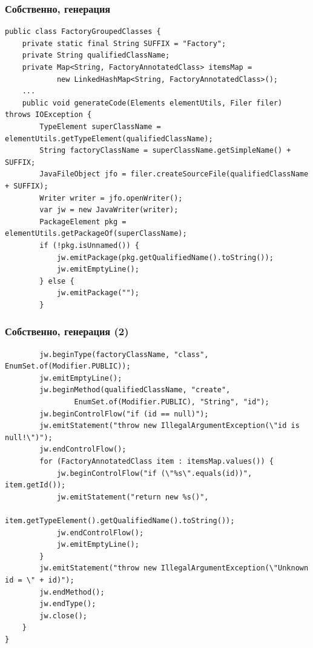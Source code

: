 \documentclass[xetex,mathserif,serif]{beamer}
\begin{document}
	\begin{frame}[fragile]
		\frametitle{Собственно, генерация}
		\begin{footnotesize}
			\begin{verbatim}
public class FactoryGroupedClasses {
    private static final String SUFFIX = "Factory";
    private String qualifiedClassName;
    private Map<String, FactoryAnnotatedClass> itemsMap =
            new LinkedHashMap<String, FactoryAnnotatedClass>();
    ...
    public void generateCode(Elements elementUtils, Filer filer) throws IOException {
        TypeElement superClassName = elementUtils.getTypeElement(qualifiedClassName);
        String factoryClassName = superClassName.getSimpleName() + SUFFIX;
        JavaFileObject jfo = filer.createSourceFile(qualifiedClassName + SUFFIX);
        Writer writer = jfo.openWriter();
        var jw = new JavaWriter(writer);
        PackageElement pkg = elementUtils.getPackageOf(superClassName);
        if (!pkg.isUnnamed()) {
            jw.emitPackage(pkg.getQualifiedName().toString());
            jw.emitEmptyLine();
        } else {
            jw.emitPackage("");
        }
			\end{verbatim}
		\end{footnotesize}
	\end{frame}

	\begin{frame}[fragile]
		\frametitle{Собственно, генерация (2)}
		\begin{footnotesize}
			\begin{verbatim}
        jw.beginType(factoryClassName, "class", EnumSet.of(Modifier.PUBLIC));
        jw.emitEmptyLine();
        jw.beginMethod(qualifiedClassName, "create", 
                EnumSet.of(Modifier.PUBLIC), "String", "id");
        jw.beginControlFlow("if (id == null)");
        jw.emitStatement("throw new IllegalArgumentException(\"id is null!\")");
        jw.endControlFlow();
        for (FactoryAnnotatedClass item : itemsMap.values()) {
            jw.beginControlFlow("if (\"%s\".equals(id))", item.getId());
            jw.emitStatement("return new %s()", 
                    item.getTypeElement().getQualifiedName().toString());
            jw.endControlFlow();
            jw.emitEmptyLine();
        }
        jw.emitStatement("throw new IllegalArgumentException(\"Unknown id = \" + id)");
        jw.endMethod();
        jw.endType();
        jw.close();
    }
}
			\end{verbatim}
		\end{footnotesize}
	\end{frame}
\end{document}
